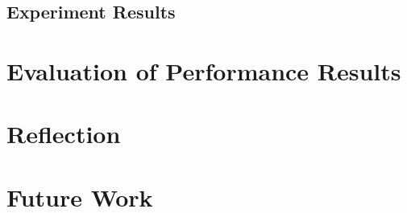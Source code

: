 \documentclass[	runningheads,
				a4paper]{llncs}
\begin{document}
	\subsection{Experiment Results}

\section{Evaluation of Performance Results}
\label{sec:exp_evaluation}
\section{Reflection}

\section{Future Work}
	
	
	
	
	
\end{document}

